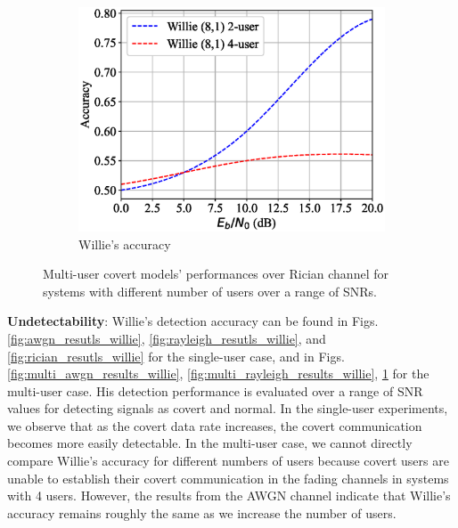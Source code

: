 \begin{figure}[tp!]
\begin{subfigure}{0.28\textwidth}
		\includegraphics[width=\linewidth]{figs/multi_willie_accuracy_rician}
		\caption{Willie's accuracy}
		\label{fig:multi_rician_results_willie}
	\end{subfigure}
	\caption{Multi-user covert models' performances over Rician channel for systems with different number of users over a range of SNRs.}
	\label{fig:multi_rician_results}
\end{figure}


\textbf{Undetectability}: Willie's detection accuracy can be found in Figs. \ref{fig:awgn_resutls_willie}, \ref{fig:rayleigh_resutls_willie}, and \ref{fig:rician_resutls_willie} for the single-user case, and in Figs. \ref{fig:multi_awgn_results_willie}, \ref{fig:multi_rayleigh_results_willie}, \ref{fig:multi_rician_results_willie} for the multi-user case. His detection performance is evaluated over a range of SNR values for detecting signals as covert and normal. In the single-user experiments, we observe that as the covert data rate increases, the covert communication becomes more easily detectable. In the multi-user case, we cannot directly compare Willie's accuracy for different numbers of users because covert users are unable to establish their covert communication in the fading channels in systems with 4 users. However, the results from the AWGN channel indicate that Willie's accuracy remains roughly the same as we increase the number of users.

